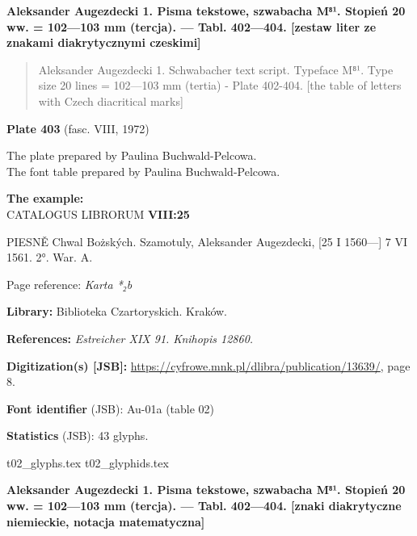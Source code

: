 \documentclass[12pt]{article}
\newcommand{\bg}{\begingl}
\newcommand{\pismoPL}[1]{{\relsize{2}\Junicode\textbf{#1}}}
\newcommand{\pismoEN}[1]{{\relsize{1}\Junicode\begin{quote}#1\end{quote}}}
\newcommand{\plate}[3]{\textbf{Plate #1} (fasc. #2, #3)}
\newcommand{\exampleBib}[1]{{\relsize{2}\Junicode\textbf{The
      example:}\\[2ex] CATALOGUS LIBRORUM \textbf{#1}}}
\newcommand{\exampleDesc}[1]{{\relsize{0}\Junicode#1}}
\newcommand{\exampleDig}[1]{{\relsize{0}\Junicode \textbf{Digitization(s) [JSB]:} #1}}
\newcommand{\exampleLib}[1]{{\relsize{0}\Junicode \textbf{Library:} #1}}
\newcommand{\examplePL}[1]{}
\newcommand{\exampleEN}[1]{}
\newcommand{\fontID}[2]{{\relsize{1}\Junicode\textbf{Font identifier} (JSB): #1 (table #2)}}
\newcommand{\fontstat}[1]{{\relsize{1}\Junicode\textbf{Statistics} (JSB): #1 glyphs.}}
\newcommand{\exampleRef}[1]{{\relsize{0}\Junicode \textbf{References:} #1}}
\newcommand{\examplePage}[1]{{Page reference: \relsize{0}\Junicode#1}}
\begin{document}
\pismoPL{Aleksander Augezdecki 1. Pisma tekstowe, szwabacha M⁸¹. Stopień 20 ww. = 102—103 mm (tercja). — Tabl. 402—404.
[zestaw liter ze znakami diakrytycznymi czeskimi]}

\pismoEN{Aleksander Augezdecki 1. Schwabacher text script. Typeface M⁸¹. Type size 20 lines = 102—103 mm (tertia) - Plate 402-404.
[the table of letters with Czech diacritical marks]}

\medskip

\plate{403}{VIII}{1972}

The plate    prepared by Paulina Buchwald-Pelcowa.\\
The font table    prepared by Paulina Buchwald-Pelcowa.\\

\bigskip

\exampleBib{VIII:25}

\medskip
\bigskip

\exampleDesc{PIESNĚ Chwal Bożských. Szamotuly, Aleksander Augezdecki, [25 I 1560—] 7 VI 1561. 2°. War. A.}

\medskip
\examplePage{\textit{Karta *₂b}}

\bigskip
\exampleLib{Biblioteka Czartoryskich. Kraków.}

\bigskip
\exampleRef{\textit{Estreicher XIX 91. Knihopis 12860.}}

\bigskip
\exampleDig{\url{https://cyfrowe.mnk.pl/dlibra/publication/13639/}, page 8.}

    \examplePL{Pismo 1: tekst i zestaw liter ze znakami diakrytycznymi czeskimi.}

    \medskip

    \exampleEN{Font 1. The text and the table of letters with Czech diacritical marks}

\bigskip

    \fontID{Au-01a}{02}

\fontstat{43}

\bigskip

 {t02_glyphs.tex}
 {t02_glyphids.tex}


\newpage

\pismoPL{Aleksander Augezdecki 1. Pisma tekstowe, szwabacha
  M⁸¹. Stopień 20 ww. = 102—103 mm (tercja). — Tabl. 402—404. [znaki
    diakrytyczne niemieckie, notacja matematyczna]}
\end{document}
